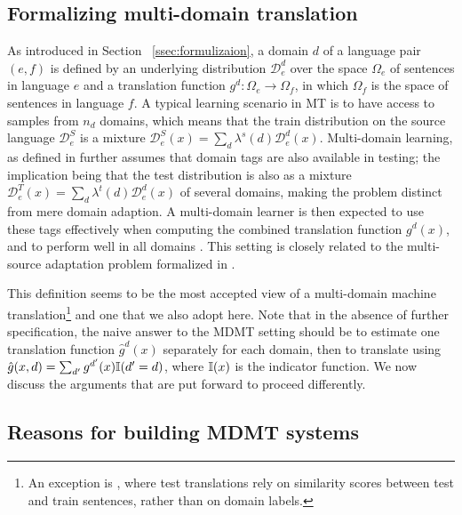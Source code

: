 \subsection{Formalizing multi-domain translation \label{ssec:formalization-chap4}}
As introduced in Section ~\ref{ssec:formulizaion}, a domain $d$ of a language pair $(e,f)$ is defined by an underlying distribution $\mathcal{D}_e^d$ over the space $\Omega_e$ of sentences in language $e$ and a translation function $g^d: \Omega_e \rightarrow \Omega_f$, in which $\Omega_f$ is the space of sentences in language $f$. A typical learning scenario in MT is to have access to samples from $n_d$ domains, which means that the train distribution on the source language $\mathcal{D}_e^S$ is a mixture $\mathcal{D}_e^S(x) = \sum_d \lambda^{s}(d) \mathcal{D}_e^{d}(x)$. Multi-domain learning, as defined in \citet{Dredze08online} further assumes that domain tags are also available in testing; the implication being that the test distribution is also as a mixture $\mathcal{D}_e^T(x) = \sum_d \lambda^{t}(d) \mathcal{D}_e^d(x)$ of several domains, making the problem distinct from mere domain adaption. A multi-domain learner is then expected to use these tags effectively \citep{Joshi12multidomain} when computing the combined translation function $g^d(x)$, and to perform well in all domains \citep{Finkel09hierarchical}. This setting is closely related to the multi-source adaptation problem formalized in \citet{Mansour09domain,Mansour09multiple,Hoffman18algorithms}.

This definition seems to be the most accepted view of a multi-domain machine translation\footnote{An exception is \citep{Farajian17multidomain}, where test translations rely on similarity scores between test and train sentences, rather than on domain labels.} and one that we also adopt here. Note that in the absence of further specification, the naive answer to the MDMT setting should be to estimate one translation function $\hat{g}^d(x)$ separately for each domain, then to translate using $\hat{g}(x,d) = \sum_{d'} g^{d'}(x) \mathbb{I}(d' = d)$, where $\mathbb{I}(x)$ is the indicator function. We now discuss the arguments that are put forward to proceed differently.

\subsection{Reasons for building MDMT systems \label{ssec:whymdmt-chap4}}

